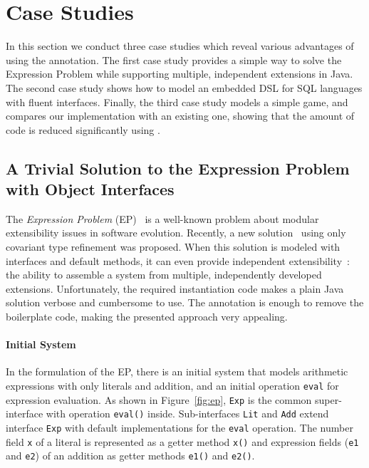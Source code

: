 \section{Case Studies}
In this section we conduct three case studies which reveal various
advantages of using the \mixin annotation. The first case study provides a
simple way to solve the Expression Problem while supporting multiple,
independent extensions in Java.  The second case study shows how to model an
embedded DSL for SQL languages with fluent interfaces. Finally, the third 
case study models a simple game, and compares our implementation with an 
existing one, showing that the amount of code is reduced significantly using \mixin.

\subsection{A Trivial Solution to the Expression Problem with Object Interfaces}

The \emph{Expression Problem} (EP)~\cite{wadler98expression} is a well-known
problem about modular extensibility issues in software evolution. Recently, a
new solution~\cite{eptrivially} using only covariant type refinement was
proposed. When this solution is modeled with interfaces and default methods, it
can even provide independent extensibility~\cite{zenger05independentlyextensible}: the ability to assemble a system
from multiple, independently developed extensions. Unfortunately, the
required instantiation code makes a plain Java solution verbose and cumbersome
to use. The \mixin annotation is enough to remove the boilerplate code, making
the presented approach very appealing.

\paragraph{Initial System}
In the formulation of the EP, there is an initial system that models
arithmetic expressions with only literals and addition, and an initial 
operation \texttt{eval} for expression evaluation.
As shown in Figure~\ref{fig:ep}, \texttt{Exp} is the common
super-interface with operation \texttt{eval()}
inside. Sub-interfaces \texttt{Lit} and \texttt{Add} extend interface
\texttt{Exp} with default implementations for the \texttt{eval} operation. The
number field \texttt{x} of a literal is represented as a getter method
\texttt{x()} and expression fields (\texttt{e1} and \texttt{e2}) of an addition
as getter methods \texttt{e1()} and \texttt{e2()}.

